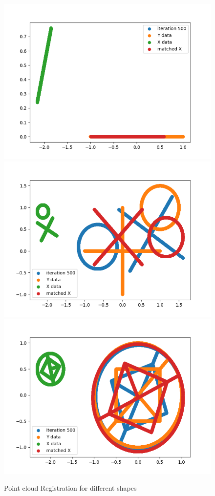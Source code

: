 \documentclass[a4paper,12pt]{article}
\begin{document}
\begin{figure}[H]
\centering
\includegraphics[scale = 0.45]{line_shape.png}
\includegraphics[scale = 0.45]{circle_cross_shape.png}
\includegraphics[scale = 0.45]{circle_shape.png}
\caption{Point cloud Registration for different shapes}\label{shape}
\end{figure}
\end{document}
